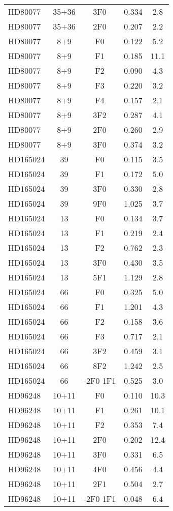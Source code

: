 \begin{table*}
\begin{tabular}{l c c c c}
HD80077 & 35+36 & 3F0 & 0.334 & 2.8\\ 
HD80077 & 35+36 & 2F0 & 0.207 & 2.2\\ 
\hline
HD80077 & 8+9 & F0 & 0.122 & 5.2\\ 
HD80077 & 8+9 & F1 & 0.185 & 11.1\\ 
HD80077 & 8+9 & F2 & 0.090 & 4.3\\ 
HD80077 & 8+9 & F3 & 0.220 & 3.2\\ 
HD80077 & 8+9 & F4 & 0.157 & 2.1\\ 
HD80077 & 8+9 & 3F2 & 0.287 & 4.1\\ 
HD80077 & 8+9 & 2F0 & 0.260 & 2.9\\ 
HD80077 & 8+9 & 3F0 & 0.374 & 3.2\\ 
\hline
HD165024 & 39 & F0 & 0.115 & 3.5\\ 
HD165024 & 39 & F1 & 0.172 & 5.0\\ 
HD165024 & 39 & 3F0 & 0.330 & 2.8\\ 
HD165024 & 39 & 9F0 & 1.025 & 3.7\\ 
\hline
HD165024 & 13 & F0 & 0.134 & 3.7\\ 
HD165024 & 13 & F1 & 0.219 & 2.4\\ 
HD165024 & 13 & F2 & 0.762 & 2.3\\ 
HD165024 & 13 & 3F0 & 0.430 & 3.5\\ 
HD165024 & 13 & 5F1 & 1.129 & 2.8\\ 
\hline
HD165024 & 66 & F0 & 0.325 & 5.0\\ 
HD165024 & 66 & F1 & 1.201 & 4.3\\ 
HD165024 & 66 & F2 & 0.158 & 3.6\\ 
HD165024 & 66 & F3 & 0.717 & 2.1\\ 
HD165024 & 66 & 3F2 & 0.459 & 3.1\\ 
HD165024 & 66 & 8F2 & 1.242 & 2.5\\ 
HD165024 & 66 & -2F0 1F1 & 0.525 & 3.0\\ 
\hline
HD96248 & 10+11 & F0 & 0.110 & 10.3\\ 
HD96248 & 10+11 & F1 & 0.261 & 10.1\\ 
HD96248 & 10+11 & F2 & 0.353 & 7.4\\ 
HD96248 & 10+11 & 2F0 & 0.202 & 12.4\\ 
HD96248 & 10+11 & 3F0 & 0.331 & 6.5\\ 
HD96248 & 10+11 & 4F0 & 0.456 & 4.4\\ 
HD96248 & 10+11 & 2F1 & 0.504 & 2.7\\ 
HD96248 & 10+11 & -2F0 1F1 & 0.048 & 6.4\\ 

\end{tabular}
\end{table*}
